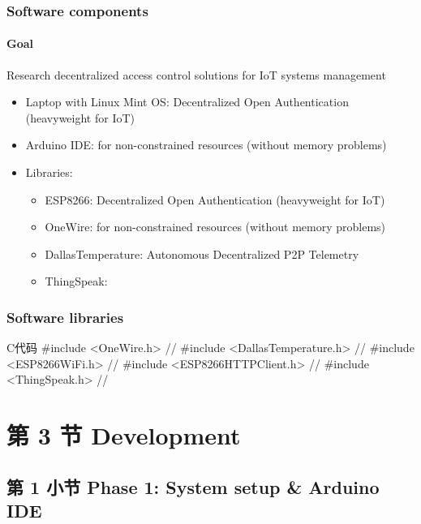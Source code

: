 \documentclass[
    aspectratio=169,                   %
]{beamer}
\begin{document}
    \begin{frame}
        \frametitle{Software components}

        \paragraph{Goal} Research decentralized access control solutions for IoT systems management

        \begin{itemize}
            \item \alert{Laptop with Linux Mint OS}: Decentralized Open Authentication (heavyweight for IoT)
            \item \alert{Arduino IDE}: for non-constrained resources (without memory problems)\cite{arduinoide}
            \item \alert{Libraries:}
            \begin{itemize}
                \item \alert{ESP8266}: Decentralized Open Authentication (heavyweight for IoT)
                \item \alert{OneWire}: for non-constrained resources (without memory problems)
                \item \alert{DallasTemperature}: Autonomous Decentralized P2P Telemetry   
                \item \alert{ThingSpeak}:      
            \end{itemize}
        \end{itemize}

    \end{frame}

    \begin{frame}[fragile]          %
        \frametitle{Software libraries}
        \begin{codeblock}[language=c]{C代码}
#include <OneWire.h> //
#include <DallasTemperature.h> //
#include <ESP8266WiFi.h> //
#include <ESP8266HTTPClient.h> //
#include <ThingSpeak.h> //
        \end{codeblock}
    \end{frame}

\section{第 3 节 Development}

\subsection{第 1 小节 Phase 1: System setup \& Arduino IDE}
\end{document}
